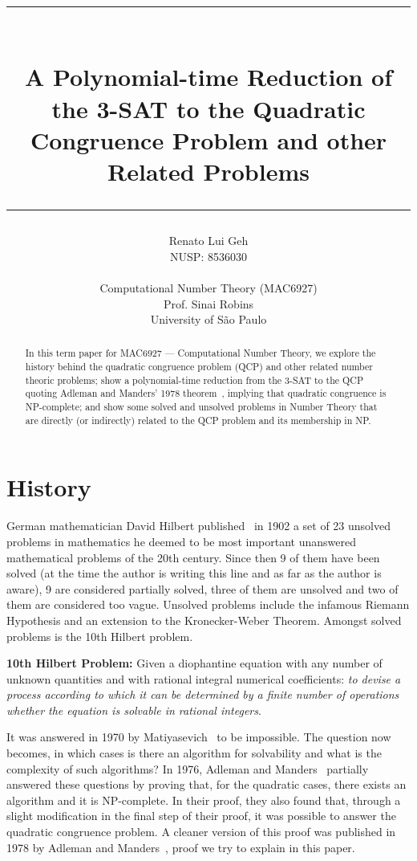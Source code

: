 \documentclass{amsart}
\title{%
  \noindent\rule{13cm}{1.0pt}\\
  \vspace{0.2cm}
  A Polynomial-time Reduction of the 3-SAT to the Quadratic Congruence Problem and other Related Problems
  \noindent\rule{13cm}{0.8pt}
}
\author[]{\normalsize Renato Lui Geh\\\small NUSP\@: 8536030\\\\Computational Number Theory
(MAC6927)\\Prof\@. Sinai Robins\\University of São Paulo\\}
\theoremstyle{plain}
\numberwithin{equation}{section}
\begin{document}
\begin{abstract}
  In this term paper for MAC6927 --- Computational Number Theory, we explore the history behind the
  quadratic congruence problem (QCP) and other related number theoric problems; show a
  polynomial-time reduction from the 3-SAT to the QCP quoting Adleman and Manders' 1978
  theorem~\cite{qcp2}, implying that quadratic congruence is NP-complete; and show some solved and
  unsolved problems in Number Theory that are directly (or indirectly) related to the QCP problem
  and its membership in NP\@.
  \vspace*{-3.5em}
\end{abstract}

\maketitle

\section{History}

German mathematician David Hilbert published~\cite{hilbert} in 1902 a set of 23 unsolved problems
in mathematics he deemed to be most important unanswered mathematical problems of the 20th century.
Since then 9 of them have been solved (at the time the author is writing this line and as far as
the author is aware), 9 are considered partially solved, three of them are unsolved and two of them
are considered too vague. Unsolved problems include the infamous Riemann Hypothesis and an
extension to the Kronecker-Weber Theorem. Amongst solved problems is the 10th Hilbert problem.

\textbf{10th Hilbert Problem:} Given a diophantine equation with any number of unknown quantities
and with rational integral numerical coefficients: \textit{to devise a process according to which
it can be determined by a finite number of operations whether the equation is solvable in rational
integers}.

It was answered in 1970 by Matiyasevich~\cite{diophantine} to be impossible. The question now
becomes, in which cases is there an algorithm for solvability and what is the complexity of such
algorithms? In 1976, Adleman and Manders~\cite{qcp1} partially answered these questions by proving
that, for the quadratic cases, there exists an algorithm and it is NP-complete. In their proof,
they also found that, through a slight modification in the final step of their proof, it was
possible to answer the quadratic congruence problem. A cleaner version of this proof was published
in 1978 by Adleman and Manders~\cite{qcp2}, proof we try to explain in this paper.
\end{document}
